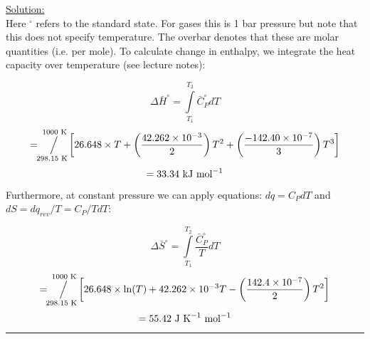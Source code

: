 \noindent
\underline{Solution:}\\

Here $^\circ$ refers to the standard state. For gases this is 1 bar pressure but note that this does not specify temperature. The overbar denotes that these are molar quantities (i.e. per mole). To calculate change in enthalpy, we integrate the heat capacity over temperature (see lecture notes):

$$\Delta\bar{H}^\circ = \int\limits_{T_1}^{T_2}\bar{C}_P^\circ dT$$
$$ = \sijoitus{298.15\textnormal{ K}}{1000\textnormal{ K}}\left[ 26.648\times T + \left(\frac{42.262\times 10^{-3}}{2}\right)T^2 + \left(\frac{-142.40\times 10^{-7}}{3}\right)T^3\right]$$
$$= 33.34\textnormal{ kJ mol}^{-1}$$

Furthermore, at constant pressure we can apply equations: $dq = C_P dT$ and $dS = dq_{rev} / T = C_P / T dT$:

$$\Delta\bar{S}^\circ = \int\limits_{T_1}^{T_2}\frac{\bar{C}_P^\circ}{T}dT$$
$$ = \sijoitus{298.15\textnormal{ K}}{1000\textnormal{ K}}\left[26.648\times\ln(T) + 42.262\times 10^{-3}T - \left(\frac{142.4\times 10^{-7}}{2}\right)T^2\right]$$
$$ = 55.42\textnormal{ J K}^{-1}\textnormal{ mol}^{-1}$$

\hrule\vspace{0.5cm}
